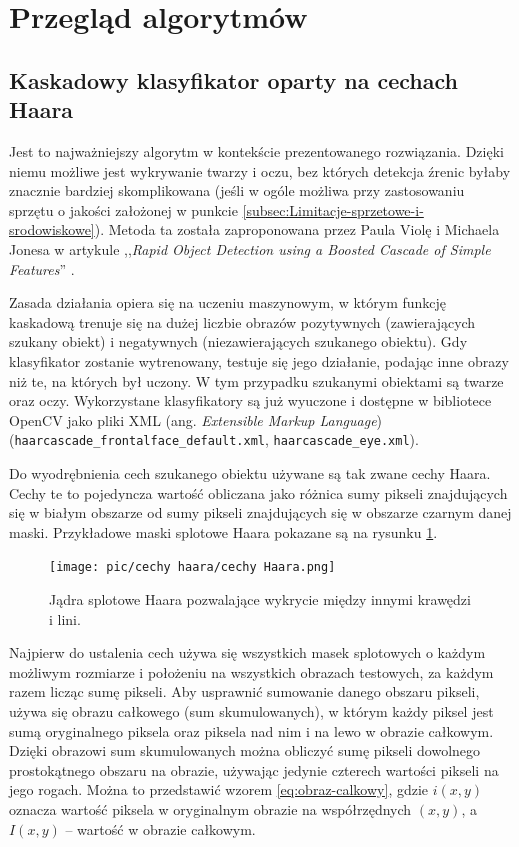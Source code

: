 \documentclass[a4paper,twoside,12pt]{book}
\newcommand{\obcy}[1]{\emph{#1}}
\newcommand{\english}[1]{{\selectlanguage{british}\obcy{#1}}}
\begin{document}
\section{Przegląd algorytmów}
\label{sec:Przegląd-algorytmow}

\subsection{Kaskadowy klasyfikator oparty na cechach Haara}
\label{subsec:kaskadowy-klasyfikator-Haara}

Jest to najważniejszy algorytm w kontekście prezentowanego rozwiązania. Dzięki niemu możliwe jest wykrywanie twarzy i oczu, bez których detekcja źrenic byłaby znacznie bardziej skomplikowana (jeśli w ogóle możliwa przy zastosowaniu sprzętu o jakości założonej w punkcie \ref{subsec:Limitacje-sprzetowe-i-srodowiskowe}). Metoda ta została zaproponowana przez Paula Violę i Michaela Jonesa w artykule ,,\english{Rapid Object Detection using a Boosted Cascade of Simple Features}'' \cite{bib:Rapid-object-detection}. 

Zasada działania opiera się na uczeniu maszynowym, w którym funkcję kaskadową trenuje się na dużej liczbie obrazów pozytywnych (zawierających szukany obiekt) i negatywnych (niezawierających szukanego obiektu). Gdy klasyfikator zostanie wytrenowany, testuje się jego działanie, podając inne obrazy niż te, na których był uczony. W tym przypadku szukanymi obiektami są twarze oraz oczy. Wykorzystane klasyfikatory są już wyuczone i dostępne w bibliotece OpenCV jako pliki XML (ang. \english{Extensible Markup Language}) (\texttt{haarcascade\_\-frontalface\_\-default\-.xml}, \texttt{haarcascade\_\-eye.\-xml}).

Do wyodrębnienia cech szukanego obiektu używane są tak zwane cechy Haara. Cechy te to pojedyncza wartość obliczana jako różnica sumy pikseli znajdujących się w białym obszarze od sumy pikseli znajdujących się w obszarze czarnym danej maski. Przykładowe maski splotowe Haara pokazane są na rysunku \ref{fig:Cechy-Haara}.

\begin{figure}[htbp]
	\centering
	\texttt{[image: pic/cechy haara/cechy Haara.png]}
	\caption{Jądra splotowe Haara pozwalające wykrycie między innymi krawędzi i lini.}
	\label{fig:Cechy-Haara}
\end{figure}

Najpierw do ustalenia cech używa się wszystkich masek splotowych o każdym możliwym rozmiarze i położeniu na wszystkich obrazach testowych, za każdym razem licząc sumę pikseli. Aby usprawnić sumowanie danego obszaru pikseli, używa się obrazu całkowego (sum skumulowanych), w którym każdy piksel jest sumą oryginalnego piksela oraz piksela nad nim i na lewo w obrazie całkowym. Dzięki obrazowi sum skumulowanych można obliczyć sumę pikseli dowolnego prostokątnego obszaru na obrazie, używając jedynie czterech wartości pikseli na jego rogach. Można to przedstawić wzorem \ref{eq:obraz-calkowy}, gdzie $i(x,y)$ oznacza wartość piksela w oryginalnym obrazie na współrzędnych $(x,y)$, a $I(x,y)$ -- wartość w obrazie całkowym.
\end{document}
